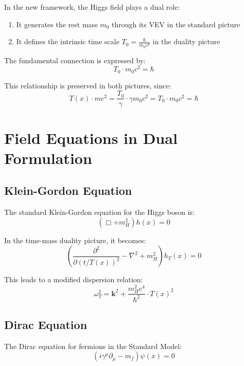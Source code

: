 \documentclass[a4paper,12pt]{article}
\newcommand{\Tfield}{T(x)} %
\begin{document}
	In the new framework, the Higgs field plays a dual role:
	\begin{enumerate}
		\item It generates the rest mass $m_0$ through its VEV in the standard picture
		\item It defines the intrinsic time scale $T_0 = \frac{\hbar}{m_0 c^2}$ in the duality picture
	\end{enumerate}
	
	The fundamental connection is expressed by:
	\begin{equation}
		T_0 \cdot m_0 c^2 = \hbar
	\end{equation}
	
	This relationship is preserved in both pictures, since:
	\begin{equation}
		\Tfield \cdot m c^2 = \frac{T_0}{\gamma} \cdot \gamma m_0 c^2 = T_0 \cdot m_0 c^2 = \hbar
	\end{equation}
	\section{Field Equations in Dual Formulation}
	
	\subsection{Klein-Gordon Equation}
	
	The standard Klein-Gordon equation for the Higgs boson is:
	\begin{equation}
		(\Box + m_H^2) h(x) = 0
	\end{equation}
	
	In the time-mass duality picture, it becomes:
	\begin{equation}
		\left(\frac{\partial^2}{\partial(t/\Tfield)^2} - \nabla^2 + m_H^2\right) h_T(x) = 0
	\end{equation}
	
	This leads to a modified dispersion relation:
	\begin{equation}
		\omega_T^2 = \mathbf{k}^2 + \frac{m_H^2 c^4}{\hbar^2} \cdot \Tfield^2
	\end{equation}
	
	\subsection{Dirac Equation}
	
	The Dirac equation for fermions in the Standard Model:
	\begin{equation}
		(i\gamma^\mu\partial_\mu - m_f) \psi(x) = 0
	\end{equation}
	
\end{document}
